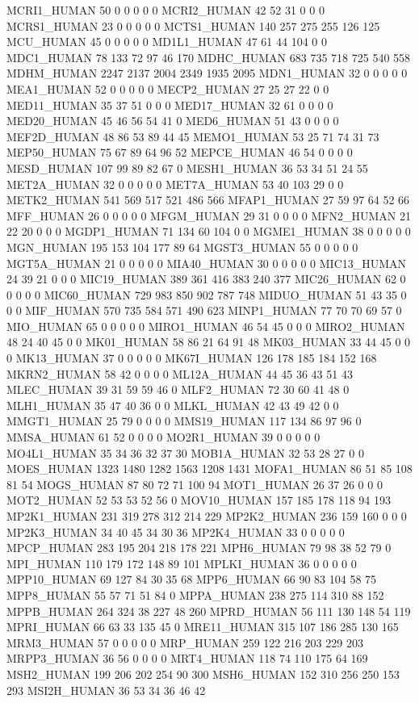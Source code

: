 MCRI1_HUMAN	50	0	0	0	0	0
MCRI2_HUMAN	42	52	31	0	0	0
MCRS1_HUMAN	23	0	0	0	0	0
MCTS1_HUMAN	140	257	275	255	126	125
MCU_HUMAN	45	0	0	0	0	0
MD1L1_HUMAN	47	61	44	104	0	0
MDC1_HUMAN	78	133	72	97	46	170
MDHC_HUMAN	683	735	718	725	540	558
MDHM_HUMAN	2247	2137	2004	2349	1935	2095
MDN1_HUMAN	32	0	0	0	0	0
MEA1_HUMAN	52	0	0	0	0	0
MECP2_HUMAN	27	25	27	22	0	0
MED11_HUMAN	35	37	51	0	0	0
MED17_HUMAN	32	61	0	0	0	0
MED20_HUMAN	45	46	56	54	41	0
MED6_HUMAN	51	43	0	0	0	0
MEF2D_HUMAN	48	86	53	89	44	45
MEMO1_HUMAN	53	25	71	74	31	73
MEP50_HUMAN	75	67	89	64	96	52
MEPCE_HUMAN	46	54	0	0	0	0
MESD_HUMAN	107	99	89	82	67	0
MESH1_HUMAN	36	53	34	51	24	55
MET2A_HUMAN	32	0	0	0	0	0
MET7A_HUMAN	53	40	103	29	0	0
METK2_HUMAN	541	569	517	521	486	566
MFAP1_HUMAN	27	59	97	64	52	66
MFF_HUMAN	26	0	0	0	0	0
MFGM_HUMAN	29	31	0	0	0	0
MFN2_HUMAN	21	22	20	0	0	0
MGDP1_HUMAN	71	134	60	104	0	0
MGME1_HUMAN	38	0	0	0	0	0
MGN_HUMAN	195	153	104	177	89	64
MGST3_HUMAN	55	0	0	0	0	0
MGT5A_HUMAN	21	0	0	0	0	0
MIA40_HUMAN	30	0	0	0	0	0
MIC13_HUMAN	24	39	21	0	0	0
MIC19_HUMAN	389	361	416	383	240	377
MIC26_HUMAN	62	0	0	0	0	0
MIC60_HUMAN	729	983	850	902	787	748
MIDUO_HUMAN	51	43	35	0	0	0
MIF_HUMAN	570	735	584	571	490	623
MINP1_HUMAN	77	70	70	69	57	0
MIO_HUMAN	65	0	0	0	0	0
MIRO1_HUMAN	46	54	45	0	0	0
MIRO2_HUMAN	48	24	40	45	0	0
MK01_HUMAN	58	86	21	64	91	48
MK03_HUMAN	33	44	45	0	0	0
MK13_HUMAN	37	0	0	0	0	0
MK67I_HUMAN	126	178	185	184	152	168
MKRN2_HUMAN	58	42	0	0	0	0
ML12A_HUMAN	44	45	36	43	51	43
MLEC_HUMAN	39	31	59	59	46	0
MLF2_HUMAN	72	30	60	41	48	0
MLH1_HUMAN	35	47	40	36	0	0
MLKL_HUMAN	42	43	49	42	0	0
MMGT1_HUMAN	25	79	0	0	0	0
MMS19_HUMAN	117	134	86	97	96	0
MMSA_HUMAN	61	52	0	0	0	0
MO2R1_HUMAN	39	0	0	0	0	0
MO4L1_HUMAN	35	34	36	32	37	30
MOB1A_HUMAN	32	53	28	27	0	0
MOES_HUMAN	1323	1480	1282	1563	1208	1431
MOFA1_HUMAN	86	51	85	108	81	54
MOGS_HUMAN	87	80	72	71	100	94
MOT1_HUMAN	26	37	26	0	0	0
MOT2_HUMAN	52	53	53	52	56	0
MOV10_HUMAN	157	185	178	118	94	193
MP2K1_HUMAN	231	319	278	312	214	229
MP2K2_HUMAN	236	159	160	0	0	0
MP2K3_HUMAN	34	40	45	34	30	36
MP2K4_HUMAN	33	0	0	0	0	0
MPCP_HUMAN	283	195	204	218	178	221
MPH6_HUMAN	79	98	38	52	79	0
MPI_HUMAN	110	179	172	148	89	101
MPLKI_HUMAN	36	0	0	0	0	0
MPP10_HUMAN	69	127	84	30	35	68
MPP6_HUMAN	66	90	83	104	58	75
MPP8_HUMAN	55	57	71	51	84	0
MPPA_HUMAN	238	275	114	310	88	152
MPPB_HUMAN	264	324	38	227	48	260
MPRD_HUMAN	56	111	130	148	54	119
MPRI_HUMAN	66	63	33	135	45	0
MRE11_HUMAN	315	107	186	285	130	165
MRM3_HUMAN	57	0	0	0	0	0
MRP_HUMAN	259	122	216	203	229	203
MRPP3_HUMAN	36	56	0	0	0	0
MRT4_HUMAN	118	74	110	175	64	169
MSH2_HUMAN	199	206	202	254	90	300
MSH6_HUMAN	152	310	256	250	153	293
MSI2H_HUMAN	36	53	34	36	46	42
